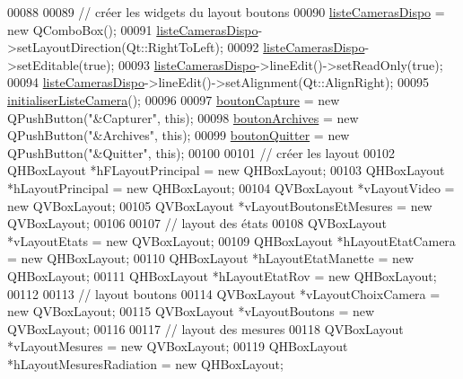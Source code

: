 \begin{DoxyCode}
00088 
00089     \textcolor{comment}{// créer les widgets du layout boutons}
00090     \hyperlink{class_i_h_m_rov_a9b9e5631b8d9b6a9801a6faac8cba0f0}{listeCamerasDispo} = \textcolor{keyword}{new} QComboBox();
00091     \hyperlink{class_i_h_m_rov_a9b9e5631b8d9b6a9801a6faac8cba0f0}{listeCamerasDispo}->setLayoutDirection(Qt::RightToLeft);
00092     \hyperlink{class_i_h_m_rov_a9b9e5631b8d9b6a9801a6faac8cba0f0}{listeCamerasDispo}->setEditable(\textcolor{keyword}{true});
00093     \hyperlink{class_i_h_m_rov_a9b9e5631b8d9b6a9801a6faac8cba0f0}{listeCamerasDispo}->lineEdit()->setReadOnly(\textcolor{keyword}{true});
00094     \hyperlink{class_i_h_m_rov_a9b9e5631b8d9b6a9801a6faac8cba0f0}{listeCamerasDispo}->lineEdit()->setAlignment(Qt::AlignRight);
00095     \hyperlink{class_i_h_m_rov_af3e46f174ab2fdeaebb2d00e6b8bcb33}{initialiserListeCamera}();
00096 
00097     \hyperlink{class_i_h_m_rov_a149c634582225cff29b6c8555eb7ba85}{boutonCapture} = \textcolor{keyword}{new} QPushButton(\textcolor{stringliteral}{"&Capturer"}, \textcolor{keyword}{this});
00098     \hyperlink{class_i_h_m_rov_a1a0c3460e0b9e9c4a1adc54f7f229307}{boutonArchives} = \textcolor{keyword}{new} QPushButton(\textcolor{stringliteral}{"&Archives"}, \textcolor{keyword}{this});
00099     \hyperlink{class_i_h_m_rov_a75b93974e71e86a6a14ea1bc47fa7bd8}{boutonQuitter} = \textcolor{keyword}{new} QPushButton(\textcolor{stringliteral}{"&Quitter"}, \textcolor{keyword}{this});
00100 
00101     \textcolor{comment}{// créer les layout}
00102     QHBoxLayout *hFLayoutPrincipal = \textcolor{keyword}{new} QHBoxLayout;
00103     QHBoxLayout *hLayoutPrincipal = \textcolor{keyword}{new} QHBoxLayout;    
00104     QVBoxLayout *vLayoutVideo = \textcolor{keyword}{new} QVBoxLayout;
00105     QVBoxLayout *vLayoutBoutonsEtMesures = \textcolor{keyword}{new} QVBoxLayout;
00106 
00107     \textcolor{comment}{// layout des états}
00108     QVBoxLayout *vLayoutEtats = \textcolor{keyword}{new} QVBoxLayout;
00109     QHBoxLayout *hLayoutEtatCamera = \textcolor{keyword}{new} QHBoxLayout;
00110     QHBoxLayout *hLayoutEtatManette = \textcolor{keyword}{new} QHBoxLayout;
00111     QHBoxLayout *hLayoutEtatRov = \textcolor{keyword}{new} QHBoxLayout;
00112 
00113     \textcolor{comment}{// layout boutons}
00114     QVBoxLayout *vLayoutChoixCamera = \textcolor{keyword}{new} QVBoxLayout;
00115     QVBoxLayout *vLayoutBoutons = \textcolor{keyword}{new} QVBoxLayout;
00116 
00117     \textcolor{comment}{// layout des mesures}
00118     QVBoxLayout *vLayoutMesures = \textcolor{keyword}{new} QVBoxLayout;
00119     QHBoxLayout *hLayoutMesuresRadiation = \textcolor{keyword}{new} QHBoxLayout;

\end{DoxyCode}
